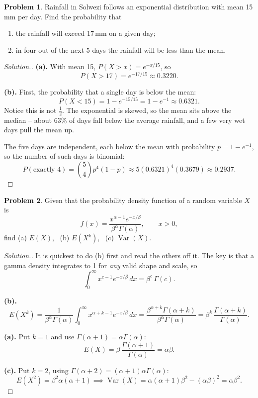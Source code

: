 \documentclass[12pt,a4paper]{report}
\theoremstyle{definition}
\theoremstyle{plain}
\theoremstyle{definition}
\newtheorem{problemx}{Problem}[section]
\newenvironment{problem}{\begin{problemx}}{\end{problemx}}
\newenvironment{solution}
  {\renewcommand{\qedsymbol}{}\begin{proof}[\textit{Solution}.]}
  {\end{proof}}
\begin{document}
\begin{problem}
Rainfall in Solwezi follows an exponential distribution with mean 15\,mm per day. Find the
probability that
\begin{enumerate}
\item[(a).] the rainfall will exceed 17\,mm on a given day;
\item[(b).] in four out of the next 5 days the rainfall will be less than the mean.
\end{enumerate}
\end{problem}

\begin{solution}
\textbf{(a).} With mean 15, $P(X>x) = e^{-x/15}$, so
\[P(X>17) = e^{-17/15} \approx 0.3220.\]

\textbf{(b).} First, the probability that a single day is below the mean:
\[P(X<15) = 1-e^{-15/15} = 1-e^{-1} \approx 0.6321.\]
Notice this is not $\tfrac12$. The exponential is skewed, so the mean sits above the
median -- about 63\% of days fall below the average rainfall, and a few very wet days pull
the mean up.

The five days are independent, each below the mean with probability
$p = 1-e^{-1}$, so the number of such days is binomial:
\[P(\text{exactly }4) = \binom{5}{4}p^{4}(1-p)
 \approx 5(0.6321)^{4}(0.3679) \approx 0.2937.\]
\end{solution}

\begin{problem}
Given that the probability density function of a random variable $X$ is
\[f(x) = \frac{x^{\alpha-1}e^{-x/\beta}}{\beta^{\alpha}\Gamma(\alpha)},\qquad x>0,\]
find (a) $E(X)$, \, (b) $E(X^{k})$, \, (c) $\operatorname{Var}(X)$.
\end{problem}

\begin{solution}
It is quickest to do (b) first and read the others off it. The key is that a gamma
density integrates to 1 for \emph{any} valid shape and scale, so
\[\int_0^{\infty}x^{c-1}e^{-x/\beta}\,dx = \beta^{c}\,\Gamma(c).\]

\textbf{(b).}
\[E(X^{k}) = \frac{1}{\beta^{\alpha}\Gamma(\alpha)}\int_0^{\infty}
 x^{\alpha+k-1}e^{-x/\beta}\,dx
 = \frac{\beta^{\alpha+k}\Gamma(\alpha+k)}{\beta^{\alpha}\Gamma(\alpha)}
 = \beta^{k}\,\frac{\Gamma(\alpha+k)}{\Gamma(\alpha)}.\]

\textbf{(a).} Put $k=1$ and use $\Gamma(\alpha+1) = \alpha\Gamma(\alpha)$:
\[E(X) = \beta\,\frac{\Gamma(\alpha+1)}{\Gamma(\alpha)} = \alpha\beta.\]

\textbf{(c).} Put $k=2$, using
$\Gamma(\alpha+2) = (\alpha+1)\alpha\Gamma(\alpha)$:
\[E(X^{2}) = \beta^{2}\alpha(\alpha+1)
 \implies \operatorname{Var}(X) = \alpha(\alpha+1)\beta^{2}-(\alpha\beta)^{2}
 = \alpha\beta^{2}.\]
\end{solution}
\end{document}
